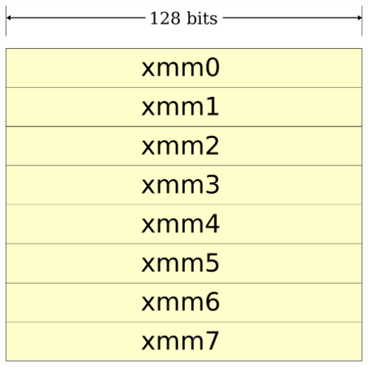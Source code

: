 \documentclass[9pt,xcolor=table]{beamer}
\begin{document}
\begin{frame}
\begin{columns}[c]
\begin{column}{.27\textwidth}
    \includegraphics[width=.9\textwidth]{img/XMM_registers}
    \vfill
  \end{column}
\end{columns}
\end{frame}
\end{document}
